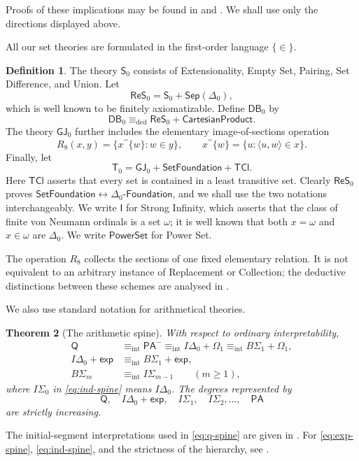 \documentclass[11pt,a4paper]{article}
\newcommand{\Q}{\mathsf Q}
\newcommand{\PA}{\mathsf{PA}}
\newcommand{\PAminus}{\mathsf{PA}^{-}}
\newcommand{\IDelta}{I\Delta_{0}}
\newcommand{\BS}[1]{B\Sigma_{#1}}
\newcommand{\expax}{\mathsf{exp}}
\newcommand{\OmegaOne}{\Omega_{1}}
\newcommand{\Szero}{\mathsf S_{0}}
\newcommand{\ReSzero}{\mathsf{ReS}_{0}}
\newcommand{\DB}{\mathsf{DB}_{0}}
\newcommand{\GJ}{\mathsf{GJ}_{0}}
\newcommand{\Tzero}{\mathsf T_{0}}
\newcommand{\Sep}[1]{\mathsf{Sep}(#1)}
\newcommand{\Fnd}[1]{#1\text{-}\mathsf{Foundation}}
\newcommand{\SetFnd}{\mathsf{SetFoundation}}
\newcommand{\Pow}{\mathsf{PowerSet}}
\newcommand{\Inf}{\mathsf I}
\newcommand{\TCl}{\mathsf{TCl}}
\newcommand{\Mint}{\mathrel{\equiv_{\mathrm{int}}}}
\newcommand{\Dedeq}{\mathrel{\equiv_{\mathrm{ded}}}}
\theoremstyle{plain}
\newtheorem{theorem}{Theorem}[section]
\theoremstyle{definition}
\newtheorem{definition}[theorem]{Definition}
\theoremstyle{remark}
\begin{document}
Proofs of these implications may be found in \citet{Mathias2007} and \citet{McKenzie2019}. We shall use only the directions displayed above.

All our set theories are formulated in the first-order language \(\{\in\}\).
\begin{definition}
The theory \(\Szero\) consists of Extensionality, Empty Set, Pairing, Set Difference, and Union. Let
\[
 \ReSzero=\Szero+\Sep{\Delta_0},
\]
which is well known to be finitely axiomatizable. Define \(\DB\) by
\[
 \DB\Dedeq\ReSzero+\mathsf{CartesianProduct}.
\]
The theory \(\GJ\) further includes the elementary image-of-sections operation
\[
 R_8(x,y)=\{x^{\prime\prime}\{w\}:w\in y\},
 \qquad x^{\prime\prime}\{w\}=\{u:\langle u,w\rangle\in x\}.
\]
Finally, let
\[
 \Tzero=\GJ+\SetFnd+\TCl.
\]
Here \(\TCl\) asserts that every set is contained in a least transitive set. Clearly \(\ReSzero\) proves \(\SetFnd\leftrightarrow\Fnd{\Delta_0}\), and we shall use the two notations interchangeably. We write \(\Inf\) for Strong Infinity, which asserts that the class of finite von Neumann ordinals is a set \(\omega\); it is well known that both \(x=\omega\) and \(x\in\omega\) are \(\Delta_0\). We write \(\Pow\) for Power Set.
\end{definition}

The operation \(R_8\) collects the sections of one fixed elementary relation. It is not equivalent to an arbitrary instance of Replacement or Collection; the deductive distinctions between these schemes are analysed in \citep{Mathias2007}.

We also use standard notation for arithmetical theories.

\begin{theorem}[The arithmetic spine]
With respect to ordinary interpretability,
\begin{align}
\Q&\Mint\PAminus
\Mint\IDelta+\OmegaOne
\Mint\BS1+\OmegaOne,                                      \label{eq:q-spine}\\
\IDelta+\expax&\Mint\BS1+\expax,                         \label{eq:exp-spine}\\
\BS{m}&\Mint I\Sigma_{m-1}\qquad(m\geq1),                \label{eq:ind-spine}
\end{align}
where \(I\Sigma_0\) in \eqref{eq:ind-spine} means \(I\Delta_0\). The degrees represented by
\[
 \Q,\quad\IDelta+\expax,\quad
 I\Sigma_1,\quad I\Sigma_2,\ldots,\quad\PA
\]
are strictly increasing.
\end{theorem}

The initial-segment interpretations used in \eqref{eq:q-spine} are given in \citet{Pudlak1985,Visser2017}. For \eqref{eq:exp-spine}, \eqref{eq:ind-spine}, and the strictness of the hierarchy, see \citet{Hajek1993Interpretability,Cheng2021}.
\end{document}
